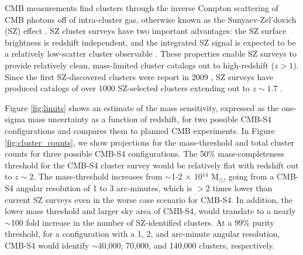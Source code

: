 CMB measurements find clusters through the inverse Compton scattering of CMB photons off of intra-cluster gas, otherwise 
known as the Sunyaev-Zel'dovich (SZ) effect \cite{Sunyaev:1972eq}. SZ cluster surveys have two important advantages: 
the SZ surface brightness is redshift independent, and the integrated SZ signal is expected to be a relatively 
low-scatter cluster observable \cite{Nagai:2005wx, Nagai:2007mt, Kravtsov:2012zs}.  These properties enable SZ surveys to provide 
relatively clean, mass-limited cluster catalogs out to high-redshift ($z > 1$).  Since the first SZ-discovered clusters were 
report in 2009 \cite{Staniszewski:2008ma}, SZ surveys have produced catalogs of over 1000 SZ-selected clusters extending out to $z \sim 1.7$ 
\cite{Vanderlinde:2010eb, Reichardt:2012yj, Hasselfield:2013wf, Ade:2013skr, Bleem:2014iim, Ade:2015mva}.  


Figure \ref{fig:limits} shows an estimate of the mass sensitivity, expressed as the one-sigma mass uncertainty as a function of redshift, for two possible CMB-S4 configurations and compares them to planned CMB experiments. 
In Figure \ref{fig:cluster_counts}, we show projections for the mass-threshold and total cluster counts for three possible CMB-S4 configurations.  
The 50\% mass-completeness threshold for the CMB-S4 cluster survey would be relatively flat with redshift out to $z \sim 2$.  
The mass-threshold increases from $\sim$1-2 $\times$ 10$^{14}$ M$_{\odot}$, going from a CMB-S4 angular resolution 
of 1 to 3 arc-minutes, which is $>$2 times lower than current SZ surveys even in the worse case scenario for CMB-S4.  
In addition, the lower mass threshold and larger sky area of CMB-S4, would translate to a nearly $\sim$100 fold increase in the 
number of SZ-identified clusters.  At a 99\% purity threshold, for a configuration with a 1, 2, and arc-minute angular 
resolution, CMB-S4 would identify $\sim$40,000, 70,000, and 140,000 clusters, respectively.  


